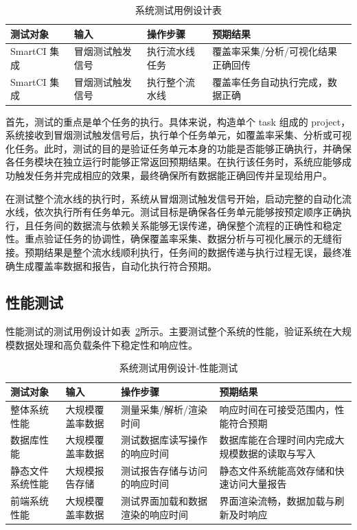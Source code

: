 \begin{table}[ht]
\centering
\caption{系统测试用例设计表}
\label{tab:6.7}
\begin{tabular}{p{2.5cm}p{2.5cm}p{3.5cm}p{4cm}}
\toprule
\textbf{测试对象} & \textbf{输入} & \textbf{操作步骤} & \textbf{预期结果} \\
\midrule
SmartCI 集成  & 冒烟测试触发信号 & 执行流水线任务 & 覆盖率采集/分析/可视化结果正确回传 \\
SmartCI 集成  & 冒烟测试触发信号 & 执行整个流水线 & 覆盖率任务自动执行完成，数据正确 \\
\bottomrule
\end{tabular}
\end{table}

首先，测试的重点是单个任务的执行。具体来说，构造单个 task 组成的 project，系统接收到冒烟测试触发信号后，执行单个任务单元，如覆盖率采集、分析或可视化任务。此时，测试的目的是验证任务单元本身的功能是否能够正确执行，并确保各任务模块在独立运行时能够正常返回预期结果。在执行该任务时，系统应能够成功触发任务并完成相应的效果，最终确保所有数据能正确回传并呈现给用户。

在测试整个流水线的执行时，系统从冒烟测试触发信号开始，启动完整的自动化流水线，依次执行所有任务单元。测试目标是确保各任务单元能够按预定顺序正确执行，且任务间的数据流与依赖关系能够无误传递，确保整个流程的正确性和稳定性。重点验证任务的协调性，确保覆盖率采集、数据分析与可视化展示的无缝衔接。预期结果是整个流水线顺利执行，任务间的数据传递与执行过程无误，最终准确生成覆盖率数据和报告，自动化执行符合预期。

\subsection{性能测试}
性能测试的测试用例设计如表~\ref{tab:6.8}所示。主要测试整个系统的性能，验证系统在大规模数据处理和高负载条件下稳定性和响应性。

\begin{table}[ht]
\centering
\caption{系统测试用例设计-性能测试}
\label{tab:6.8}
\begin{tabular}{p{2.5cm}p{2.5cm}p{3.5cm}p{4cm}}
\toprule
\textbf{测试对象} & \textbf{输入} & \textbf{操作步骤} & \textbf{预期结果} \\
\midrule
整体系统性能 & 大规模覆盖率数据 & 测量采集/解析/渲染时间 & 响应时间在可接受范围内，性能符合预期 \\
数据库性能 & 大规模覆盖率数据 & 测试数据库读写操作的响应时间 & 数据库能在合理时间内完成大规模数据的读取与写入 \\
静态文件系统性能 & 大规模报告存储 & 测试报告存储与访问的响应时间 & 静态文件系统能高效存储和快速访问大量报告 \\
前端系统性能 & 大规模覆盖率数据 & 测试界面加载和数据渲染的响应时间 & 界面渲染流畅，数据加载与刷新及时响应 \\
\bottomrule
\end{tabular}
\end{table}

